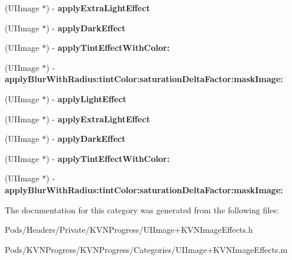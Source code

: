 \begin{DoxyCompactItemize}
(U\+I\+Image $\ast$) -\/ {\bfseries apply\+Extra\+Light\+Effect}
\item 
\mbox{\label{category_u_i_image_07_k_v_n_image_effects_08_a0d908f41126769c4bfc4a0997a6c8b44}} 
(U\+I\+Image $\ast$) -\/ {\bfseries apply\+Dark\+Effect}
\item 
\mbox{\label{category_u_i_image_07_k_v_n_image_effects_08_a710daf890ddde86dcfe1193520a167da}} 
(U\+I\+Image $\ast$) -\/ {\bfseries apply\+Tint\+Effect\+With\+Color\+:}
\item 
\mbox{\label{category_u_i_image_07_k_v_n_image_effects_08_ade5cf838112fae8cb8a744233d20395b}} 
(U\+I\+Image $\ast$) -\/ {\bfseries apply\+Blur\+With\+Radius\+:tint\+Color\+:saturation\+Delta\+Factor\+:mask\+Image\+:}
\item 
\mbox{\label{category_u_i_image_07_k_v_n_image_effects_08_a0bc4ead8a6ba21153bc16077cc829e18}} 
(U\+I\+Image $\ast$) -\/ {\bfseries apply\+Light\+Effect}
\item 
\mbox{\label{category_u_i_image_07_k_v_n_image_effects_08_ab9ba480faa581daadfb3b48958f3cb42}} 
(U\+I\+Image $\ast$) -\/ {\bfseries apply\+Extra\+Light\+Effect}
\item 
\mbox{\label{category_u_i_image_07_k_v_n_image_effects_08_a0d908f41126769c4bfc4a0997a6c8b44}} 
(U\+I\+Image $\ast$) -\/ {\bfseries apply\+Dark\+Effect}
\item 
\mbox{\label{category_u_i_image_07_k_v_n_image_effects_08_a710daf890ddde86dcfe1193520a167da}} 
(U\+I\+Image $\ast$) -\/ {\bfseries apply\+Tint\+Effect\+With\+Color\+:}
\item 
\mbox{\label{category_u_i_image_07_k_v_n_image_effects_08_ade5cf838112fae8cb8a744233d20395b}} 
(U\+I\+Image $\ast$) -\/ {\bfseries apply\+Blur\+With\+Radius\+:tint\+Color\+:saturation\+Delta\+Factor\+:mask\+Image\+:}
\end{DoxyCompactItemize}


The documentation for this category was generated from the following files\+:\begin{DoxyCompactItemize}
\item 
Pods/\+Headers/\+Private/\+K\+V\+N\+Progress/U\+I\+Image+\+K\+V\+N\+Image\+Effects.\+h\item 
Pods/\+K\+V\+N\+Progress/\+K\+V\+N\+Progress/\+Categories/U\+I\+Image+\+K\+V\+N\+Image\+Effects.\+m\end{DoxyCompactItemize}

